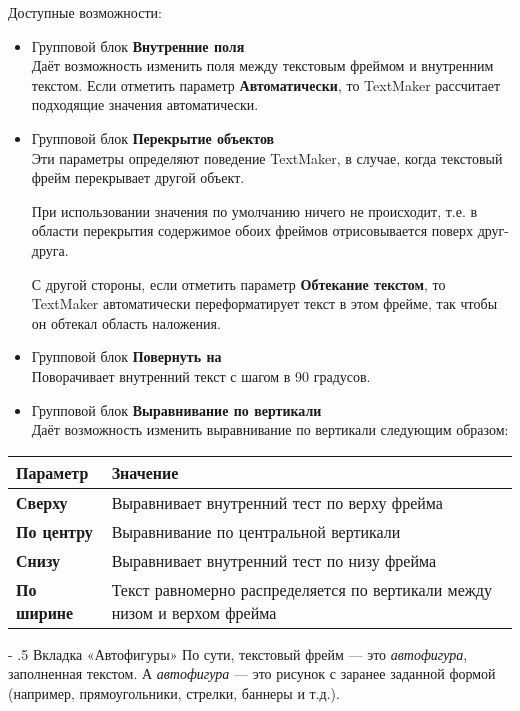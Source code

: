 \documentclass[a4paper,10pt]{article}
\makeatletter
\renewcommand\paragraph{%
   \@startsection{paragraph}{4}{0mm}%
      {-\baselineskip}%
      {.5\baselineskip}%
      {\normalfont\normalsize\bfseries}}
\makeatother
\begin{document}
Доступные возможности:

\begin{itemize}
 \item Групповой блок \textbf{Внутренние поля}\\
 Даёт возможность изменить поля между текстовым фреймом и внутренним текстом. Если отметить параметр \textbf{Автоматически}, то TextMaker рассчитает подходящие значения автоматически.
 \item Групповой блок \textbf{Перекрытие объектов}\\
 Эти параметры определяют поведение TextMaker, в случае, когда текстовый фрейм перекрывает другой объект.
 
 При использовании значения по умолчанию ничего не происходит, т.е. в области перекрытия содержимое обоих фреймов отрисовывается поверх друг-друга.
 
 С другой стороны, если отметить параметр \textbf{Обтекание текстом}, то TextMaker автоматически переформатирует текст в этом фрейме, так чтобы он обтекал область наложения.
 \item Групповой блок \textbf{Повернуть на}\\
 Поворачивает внутренний текст с шагом в 90 градусов.
 \item Групповой блок \textbf{Выравнивание по вертикали}\\
 Даёт возможность изменить выравнивание по вертикали следующим образом:
\end{itemize}

\begin{center}
\begin{tabular}{  m{4cm}  m{12cm}  }
 \textbf{Параметр} & \textbf{Значение}\\ 
 \hline
  \textbf{Сверху} & Выравнивает внутренний тест по верху фрейма\\
  \textbf{По центру} & Выравнивание по центральной вертикали\\ 
\textbf{Снизу} & Выравнивает внутренний тест по низу фрейма\\
\textbf{По ширине} & Текст равномерно распределяется по вертикали между низом и верхом фрейма\\
\end{tabular}
\end{center}

\paragraph{Вкладка «Автофигуры»}
По сути, текстовый фрейм --- это \textit{автофигура}, заполненная текстом. А \textit{автофигура} --- это рисунок с заранее заданной формой (например, прямоугольники, стрелки, баннеры и т.д.).
\end{document}
